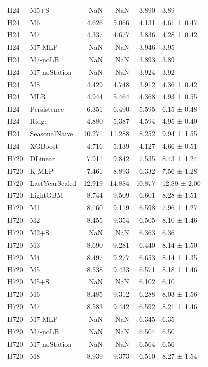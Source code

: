 \begin{tabular}{llrrrl}
H24 & M5+S & NaN & NaN & 3.890 & 3.89 \\
H24 & M6 & 4.626 & 5.066 & 4.131 & 4.61 ± 0.47 \\
H24 & M7 & 4.337 & 4.677 & 3.836 & 4.28 ± 0.42 \\
H24 & M7-MLP & NaN & NaN & 3.946 & 3.95 \\
H24 & M7-noLB & NaN & NaN & 3.893 & 3.89 \\
H24 & M7-noStation & NaN & NaN & 3.924 & 3.92 \\
H24 & M8 & 4.429 & 4.748 & 3.912 & 4.36 ± 0.42 \\
H24 & MLR & 4.944 & 5.464 & 4.368 & 4.93 ± 0.55 \\
H24 & Persistence & 6.351 & 6.490 & 5.595 & 6.15 ± 0.48 \\
H24 & Ridge & 4.880 & 5.387 & 4.594 & 4.95 ± 0.40 \\
H24 & SeasonalNaive & 10.271 & 11.288 & 8.252 & 9.94 ± 1.55 \\
H24 & XGBoost & 4.716 & 5.139 & 4.127 & 4.66 ± 0.51 \\
H720 & DLinear & 7.911 & 9.842 & 7.535 & 8.43 ± 1.24 \\
H720 & K-MLP & 7.461 & 8.893 & 6.332 & 7.56 ± 1.28 \\
H720 & LastYearScaled & 12.919 & 14.884 & 10.877 & 12.89 ± 2.00 \\
H720 & LightGBM & 8.744 & 9.509 & 6.601 & 8.28 ± 1.51 \\
H720 & M1 & 8.160 & 9.119 & 6.598 & 7.96 ± 1.27 \\
H720 & M2 & 8.455 & 9.354 & 6.505 & 8.10 ± 1.46 \\
H720 & M2+S & NaN & NaN & 6.363 & 6.36 \\
H720 & M3 & 8.690 & 9.281 & 6.440 & 8.14 ± 1.50 \\
H720 & M4 & 8.497 & 9.277 & 6.653 & 8.14 ± 1.35 \\
H720 & M5 & 8.538 & 9.433 & 6.571 & 8.18 ± 1.46 \\
H720 & M5+S & NaN & NaN & 6.102 & 6.10 \\
H720 & M6 & 8.485 & 9.312 & 6.288 & 8.03 ± 1.56 \\
H720 & M7 & 8.583 & 9.442 & 6.592 & 8.21 ± 1.46 \\
H720 & M7-MLP & NaN & NaN & 6.345 & 6.35 \\
H720 & M7-noLB & NaN & NaN & 6.504 & 6.50 \\
H720 & M7-noStation & NaN & NaN & 6.564 & 6.56 \\
H720 & M8 & 8.939 & 9.373 & 6.510 & 8.27 ± 1.54 \\

\end{tabular}
